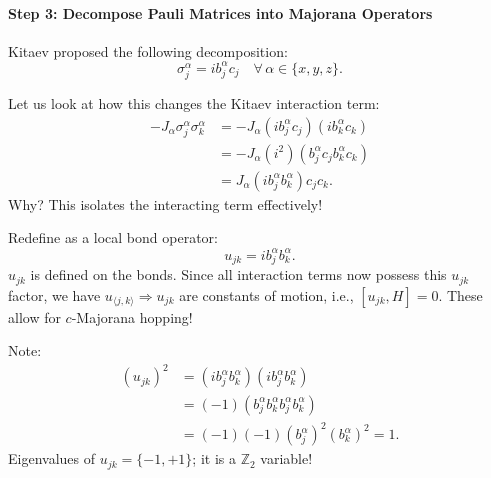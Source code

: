 \documentclass[11pt,a4paper]{article}
\begin{document}
\paragraph{Step 3: Decompose Pauli Matrices into Majorana Operators}
Kitaev proposed the following decomposition:
\begin{equation}
    \sigma_j^\alpha = i b_j^\alpha c_j \quad \forall\, \alpha \in \{x,y,z\}.
\end{equation}

Let us look at how this changes the Kitaev interaction term:
\begin{align}
    -J_\alpha \sigma_j^\alpha \sigma_k^\alpha &= -J_\alpha (i b_j^\alpha c_j)(i b_k^\alpha c_k) \nonumber \\
    &= -J_\alpha (i^2) (b_j^\alpha c_j b_k^\alpha c_k) \nonumber \\
    &= J_\alpha (i b_j^\alpha b_k^\alpha) c_j c_k.
\end{align}
Why? This isolates the interacting term effectively!

Redefine as a local bond operator:
\begin{equation}
    u_{jk} = i b_j^\alpha b_k^\alpha.
\end{equation}
$u_{jk}$ is defined on the bonds. Since all interaction terms now possess this $u_{jk}$ factor, we have $u_{\langle j,k \rangle} \Rightarrow u_{jk}$ are constants of motion, i.e., $[u_{jk}, H] = 0$. These allow for $c$-Majorana hopping!

Note:
\begin{align}
    (u_{jk})^2 &= (i b_j^\alpha b_k^\alpha)(i b_j^\alpha b_k^\alpha) \nonumber \\
    &= (-1) (b_j^\alpha b_k^\alpha b_j^\alpha b_k^\alpha) \nonumber \\
    &= (-1) (-1) (b_j^\alpha)^2 (b_k^\alpha)^2 = 1.
\end{align}
Eigenvalues of $u_{jk} = \{-1, +1\}$; it is a $\mathbb{Z}_2$ variable!
\end{document}

